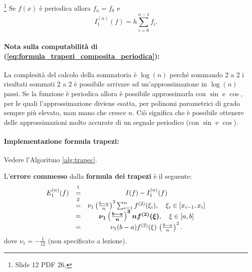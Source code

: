 
\begin{remark}
    \footnote{Slide 12 PDF 26.} Se $f(x)$ è periodica allora $f_n=f_0$ e
    \begin{equation}\label{eq:formula_trapezi_composita_periodica}
    	I_1^{(n)}(f)=h \sum_{i=0}^{n-1}f_i.
    \end{equation}
\end{remark}

\paragraph{Nota sulla computabilità di (\ref{eq:formula_trapezi_composita_periodica}):} La complesità del calcolo della sommatoria è $\log (n)$ perché sommando 2 a 2 i risultati sommati 2 a 2 è possibile arrivare ad un'approssimazione in $\log (n)$ passi. Se la funzione è periodica allora è possibile approssimarla con $\sin$ e $\cos$, per le quali l'approssimazione diviene esatta, per polinomi parametrici di grado sempre più elevato, man mano che cresce $n$. Ciò significa che è possibile ottenere delle approssimazioni molto accurate di un segnale periodico (con $\sin$ e $\cos$).

\paragraph{Implementazione formula trapezi:} Vedere l'Algoritmo \ref{alg:trapec}.

\begin{definition}
    L'\textbf{errore commesso} dalla \textbf{formula dei trapezi} è il seguente:
    \begin{equation}\label{eq:errore_formula_trapezi_composita}
        \begin{matrix}
            E_1^{(n)}(f) &\overset{\footnotemark}{=}& I(f)-I_1^{(n)}(f)\\
            &\overset{\footnotemark}{=}&\nu_1 \left(\frac{b-a}{n}\right)^3 \sum_{i=1}^n f^{(2)}(\xi_i),\quad \xi_i\in[x_{i-1},x_i]\\
            &=&\boldsymbol{\nu_1 \left(\frac{b-a}{n}\right)^{3} n  f^{(2)}(\xi)},\quad \xi\in[a,b] \\
            &=& \nu_1 (b-a)f^{(2)}(\xi)\,\left(\frac{b-a}{n}\right)^2.
        \end{matrix}
    \end{equation}
    dove $\nu_1=-\frac{1}{12}$ (non specificato a lezione).
\end{definition}

